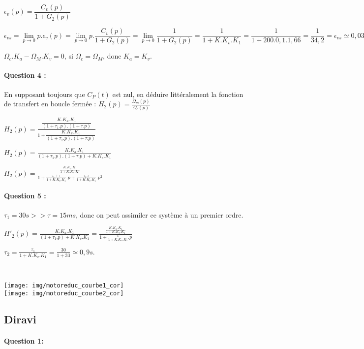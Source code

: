 $\epsilon_v(p)=\dfrac{C_v(p)}{1+G_2(p)}$

$\epsilon_{vs}=\lim\limits_{p \rightarrow 0} p.\epsilon_v(p)=\lim\limits_{p \rightarrow 0} p.\dfrac{C_v(p)}{1+G_2(p)}=\lim\limits_{p \rightarrow 0} \dfrac{1}{1+G_2(p)}=\dfrac{1}{1+K.K_v.K_1}=\dfrac{1}{1+200.0,1.1,66}=\dfrac{1}{34,2}=\epsilon_{vs}\simeq0,03$

$\Omega_c.K_a-\Omega_M.K_v=0$, si $\Omega_c=\Omega_M$, donc $K_a=K_v$.

\paragraph{Question 4 :} En supposant toujours que $C_P(t)$ est nul, en déduire littéralement la fonction de transfert en boucle fermée : $H_2(p)=\frac{\Omega_m(p)}{\Omega_c(p)}$	

$H_2(p)=\frac{\dfrac{K.K_a.K_1}{(1+\tau_1.p).(1+\tau.p)}}{1+\dfrac{K.K_v.K_1}{(1+\tau_1.p).(1+\tau.p)}}$

$H_2(p)=\frac{K.K_a.K_1}{(1+\tau_1.p).(1+\tau.p)+K.K_v.K_1}$

$H_2(p)=\frac{\frac{K.K_a.K_1}{1+K.K_v.K_1}}{1+\frac{\tau_1+\tau}{1+K.K_v.K_1}.p+\frac{\tau_1.\tau}{1+K.K_v.K_1}.p^2}$

\paragraph{Question 5 :} 

$\tau_1=30s >> \tau=15ms$, donc on peut assimiler ce système à un premier ordre.

$H'_2(p)=\frac{K.K_a.K_1}{(1+\tau_1.p)+K.K_v.K_1}=\frac{\frac{K.K_a.K_1}{1+K.K_v.K_1}}{1+\frac{\tau_1}{1+K.K_v.K_1}.p}$

$\tau_2=\frac{\tau_1}{1+K.K_v.K_1}=\frac{30}{1+33}\simeq0,9s.$

~\

\begin{center}
\texttt{[image: img/motoreduc\_courbe1\_cor]} \\
\texttt{[image: img/motoreduc\_courbe2\_cor]}
\end{center}

\subsection{Diravi}

\paragraph{Question 1:}

